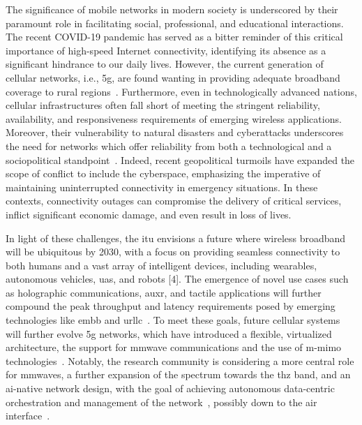 The significance of mobile networks in modern society is underscored by their paramount role in facilitating social, professional, and educational interactions. The recent COVID-19 pandemic has served as a bitter reminder of this critical importance of high-speed Internet connectivity, identifying its absence as a significant hindrance to our daily lives.
However, the current generation of cellular networks, i.e., \gls{5g}, are found wanting in providing adequate broadband coverage to rural regions~\cite{yaacoub2020key}. Furthermore, even in technologically advanced nations, cellular infrastructures often fall short of meeting the stringent reliability, availability, and responsiveness requirements of emerging wireless applications. Moreover, their vulnerability to natural disasters and cyberattacks underscores the need for networks which offer reliability from both a technological and a sociopolitical standpoint~\cite{internet_ukr_afg}.
Indeed, recent geopolitical turmoils have expanded the scope of conflict to include the cyberspace, emphasizing the imperative of maintaining uninterrupted connectivity in emergency situations. In these contexts, connectivity outages can compromise the delivery of critical services, inflict significant economic damage, and even result in loss of lives.

In light of these challenges, the \gls{itu} envisions a future where wireless broadband will be ubiquitous by 2030, with a focus on providing seamless connectivity to both humans and a vast array of intelligent devices, including wearables, autonomous vehicles, \gls{uas}, and robots [4]. The emergence of novel use cases such as holographic communications, au\gls{xr}, and tactile applications will further compound the peak throughput and latency requirements posed by emerging technologies like \gls{embb} and \gls{urllc}~\cite{itu-r-2083}.
To meet these goals, future cellular systems will further evolve \gls{5g} networks, which have introduced a flexible, virtualized architecture, the support for \gls{mmwave} communications and the use of \gls{m-mimo} technologies~\cite{ghosh20195g}. Notably, the research community is considering a more central role for \glspl{mmwave}, a further expansion of the spectrum towards the \gls{thz} band, and an \gls{ai}-native network design, with the goal of achieving autonomous data-centric orchestration and management of the network~\cite{polese20216g}, possibly down to the air interface~\cite{hoydis2021toward}.

